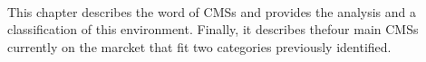 \paragraph{}
This chapter describes the word of CMSs and provides the analysis and a classification of this environment. Finally, it describes thefour main CMSs currently on the marcket that fit two categories previously identified.